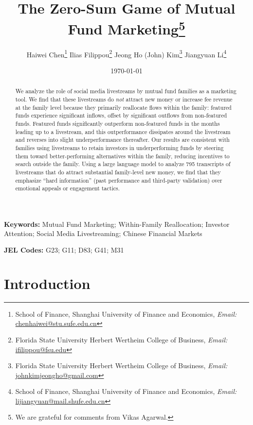 \documentclass[12pt]{article}
\title{The Zero-Sum Game of Mutual Fund Marketing\thanks{We are grateful for comments from Vikas Agarwal.}}
\author{
Haiwei Chen\thanks{School of Finance, Shanghai University of Finance and Economics, \textit{Email: }\url{chenhaiwei@stu.sufe.edu.cn}}
\quad
Ilias Filippou\thanks{Florida State University Herbert Wertheim College of Business, \textit{Email: }\url{ifilippou@fsu.edu}}
\quad
Jeong Ho (John) Kim\thanks{Florida State University Herbert Wertheim College of Business, \textit{Email: }\url{johnkimjeongho@gmail.com}}
\quad
Jiangyuan Li\thanks{School of Finance, Shanghai University of Finance and Economics, \textit{Email: }\url{lijiangyuan@mail.shufe.edu.cn}}}
\date{\today}
\begin{document}
\maketitle
\thispagestyle{empty}

\begin{abstract}
We analyze the role of social media livestreams by mutual fund families as a marketing tool. We find that these livestreams do \textit{not} attract new money or increase fee revenue at the family level because they primarily reallocate flows within the family: featured funds experience significant inflows, offset by significant outflows from non-featured funds. Featured funds significantly outperform non-featured funds in the months leading up to a livestream, and this outperformance dissipates around the livestream and reverses into slight underperformance thereafter. Our results are consistent with families using livestreams to retain investors in underperforming funds by steering them toward better-performing alternatives within the family, reducing incentives to search outside the family. Using a large language model to analyze 795 transcripts of livestreams that do attract substantial family-level new money, we find that they emphasize ``hard information'' (past performance and third-party validation) over emotional appeals or engagement tactics. 

\end{abstract}

\begin{center}
\begin{minipage}{0.88\textwidth}
\textbf{Keywords:} Mutual Fund Marketing; Within-Family Reallocation; Investor Attention; Social Media Livestreaming; Chinese Financial Markets

\textbf{JEL Codes:} G23; G11; D83; G41; M31
\end{minipage}
\end{center}


\doublespacing%

\clearpage
\setcounter{page}{1}

\section{Introduction}
\end{document}
